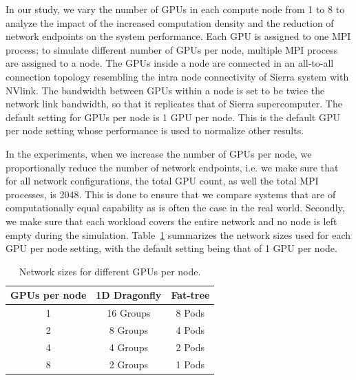 \vspace{0.08in}
In our study, we vary the number of GPUs in each compute node from 1 to
8 to analyze the impact of the increased computation density and the reduction
of network endpoints on the system performance. Each GPU is assigned
to one MPI process; to simulate different number of GPUs
per node, multiple MPI process are assigned to a node.
The GPUs inside a node are connected in an all-to-all connection topology resembling the intra node connectivity of Sierra system with NVlink.
The bandwidth between GPUs within a node
is set to be twice the network link bandwidth, so that it replicates that of Sierra supercomputer.
The default setting for GPUs per node is 1 GPU per node. This is the default
GPU per node setting whose performance is used to normalize other results. 

In the experiments, when we increase the number of GPUs per node, we
proportionally reduce the number of network endpoints, i.e. we make sure that
for all network configurations, the total GPU count, as well the total MPI
  processes, is 2048. This is done
  to ensure that we compare systems that are of computationally equal capability
  as is often the case in the real world. Secondly, we make sure that each
  workload covers the entire network and no node is left empty during the
  simulation. 
  Table~\ref{table:configs} summarizes the network sizes used for each GPU
  per node setting, with the default setting being that of 1 GPU per node.  

\begin{table}[h]
       \centering
\caption{Network sizes for different GPUs per node.}
        \vspace{-1em}
        \begin{tabular}{ccc} \toprule
        \textbf{GPUs per node} & \textbf{1D Dragonfly} & \textbf{Fat-tree}\\ \midrule 
        1 & 16 Groups & 
        8 Pods \\
        
        2 &
        8 Groups & 
        4 Pods \\
        
        4 & 4 Groups & 
        2 Pods \\
        
        8 & 
        2 Groups & 
        1 Pods\\ \bottomrule
        \end{tabular}
\label{table:configs}
\end{table}

